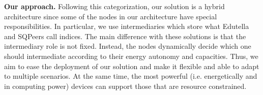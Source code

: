 \noindent\textbf{Our approach.}
Following this categorization, our solution is a hybrid architecture since some of the nodes in our architecture have special responsibilities.
In particular, we use intermediaries which store what Edutella and SQPeers call indices.
The main difference with these solutions is that the intermediary role is not fixed. %
Instead, the nodes dynamically decide which one should intermediate according to their energy autonomy and capacities.
Thus, we aim to ease the deployment of our solution and make it flexible and able to adapt to multiple scenarios.
At the same time, the most powerful (i.e. energetically and in computing power) devices can support those that are resource constrained.






